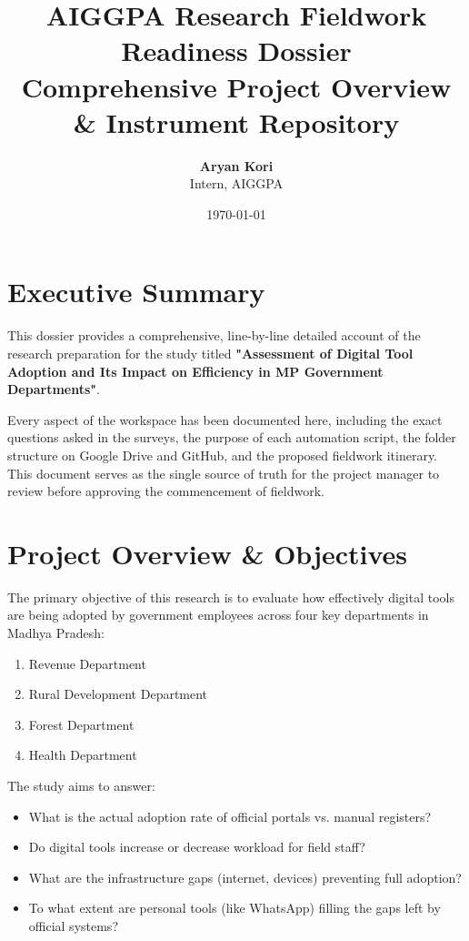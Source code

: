 \documentclass[11pt,a4paper]{article}
\title{\LARGE \bfseries \color{primary} AIGGPA Research Fieldwork Readiness Dossier \\ \Large Comprehensive Project Overview \& Instrument Repository}
\author{\textbf{Aryan Kori} \\ Intern, AIGGPA}
\date{\today}
\begin{document}
\maketitle
\tableofcontents
\newpage

\section{Executive Summary}
This dossier provides a comprehensive, line-by-line detailed account of the research preparation for the study titled \textbf{"Assessment of Digital Tool Adoption and Its Impact on Efficiency in MP Government Departments"}. 

Every aspect of the workspace has been documented here, including the exact questions asked in the surveys, the purpose of each automation script, the folder structure on Google Drive and GitHub, and the proposed fieldwork itinerary. This document serves as the single source of truth for the project manager to review before approving the commencement of fieldwork.

\section{Project Overview \& Objectives}
The primary objective of this research is to evaluate how effectively digital tools are being adopted by government employees across four key departments in Madhya Pradesh:
\begin{enumerate}[label=\alph*)]
    \item Revenue Department
    \item Rural Development Department
    \item Forest Department
    \item Health Department
\end{enumerate}

The study aims to answer:
\begin{itemize}
    \item What is the actual adoption rate of official portals vs. manual registers?
    \item Do digital tools increase or decrease workload for field staff?
    \item What are the infrastructure gaps (internet, devices) preventing full adoption?
    \item To what extent are personal tools (like WhatsApp) filling the gaps left by official systems?
\end{itemize}
\end{document}
